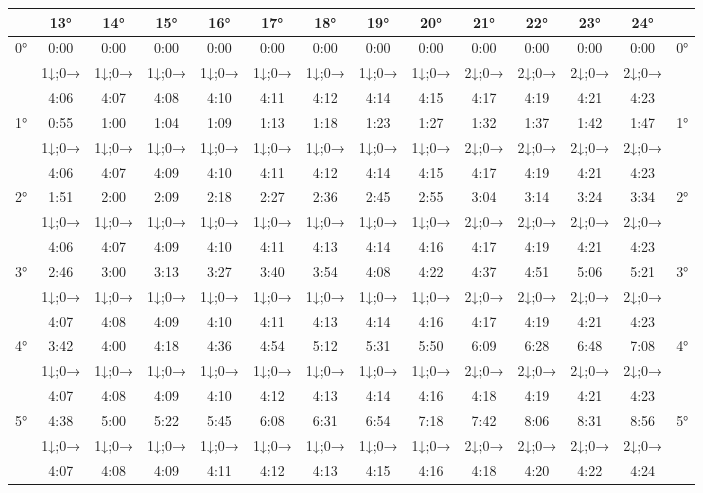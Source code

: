 \begin{scriptsize}\begin{tabular}{c || c | c | c | c | c | c | c | c | c | c | c | c || c}
		\space &13°&14°&15°&16°&17°&18°&19°&20°&21°&22°&23°&24°\\\hline\hline
		\multirow{3}{*}{0°}&0:00&0:00&0:00&0:00&0:00&0:00&0:00&0:00&0:00&0:00&0:00&0:00&\multirow{3}{*}{0°}\\ \space&1↓;0→&1↓;0→&1↓;0→&1↓;0→&1↓;0→&1↓;0→&1↓;0→&1↓;0→&2↓;0→&2↓;0→&2↓;0→&2↓;0→&\space\\&4:06&4:07&4:08&4:10&4:11&4:12&4:14&4:15&4:17&4:19&4:21&4:23&\space\\\hline
		\multirow{3}{*}{1°}&0:55&1:00&1:04&1:09&1:13&1:18&1:23&1:27&1:32&1:37&1:42&1:47&\multirow{3}{*}{1°}\\ \space&1↓;0→&1↓;0→&1↓;0→&1↓;0→&1↓;0→&1↓;0→&1↓;0→&1↓;0→&2↓;0→&2↓;0→&2↓;0→&2↓;0→&\space\\&4:06&4:07&4:09&4:10&4:11&4:12&4:14&4:15&4:17&4:19&4:21&4:23&\space\\\hline
		\multirow{3}{*}{2°}&1:51&2:00&2:09&2:18&2:27&2:36&2:45&2:55&3:04&3:14&3:24&3:34&\multirow{3}{*}{2°}\\ \space&1↓;0→&1↓;0→&1↓;0→&1↓;0→&1↓;0→&1↓;0→&1↓;0→&1↓;0→&2↓;0→&2↓;0→&2↓;0→&2↓;0→&\space\\&4:06&4:07&4:09&4:10&4:11&4:13&4:14&4:16&4:17&4:19&4:21&4:23&\space\\\hline
		\multirow{3}{*}{3°}&2:46&3:00&3:13&3:27&3:40&3:54&4:08&4:22&4:37&4:51&5:06&5:21&\multirow{3}{*}{3°}\\ \space&1↓;0→&1↓;0→&1↓;0→&1↓;0→&1↓;0→&1↓;0→&1↓;0→&1↓;0→&2↓;0→&2↓;0→&2↓;0→&2↓;0→&\space\\&4:07&4:08&4:09&4:10&4:11&4:13&4:14&4:16&4:17&4:19&4:21&4:23&\space\\\hline
		\multirow{3}{*}{4°}&3:42&4:00&4:18&4:36&4:54&5:12&5:31&5:50&6:09&6:28&6:48&7:08&\multirow{3}{*}{4°}\\ \space&1↓;0→&1↓;0→&1↓;0→&1↓;0→&1↓;0→&1↓;0→&1↓;0→&1↓;0→&2↓;0→&2↓;0→&2↓;0→&2↓;0→&\space\\&4:07&4:08&4:09&4:10&4:12&4:13&4:14&4:16&4:18&4:19&4:21&4:23&\space\\\hline
		\multirow{3}{*}{5°}&4:38&5:00&5:22&5:45&6:08&6:31&6:54&7:18&7:42&8:06&8:31&8:56&\multirow{3}{*}{5°}\\ \space&1↓;0→&1↓;0→&1↓;0→&1↓;0→&1↓;0→&1↓;0→&1↓;0→&1↓;0→&2↓;0→&2↓;0→&2↓;0→&2↓;0→&\space\\&4:07&4:08&4:09&4:11&4:12&4:13&4:15&4:16&4:18&4:20&4:22&4:24&\space\\\hline

\end{tabular}
\end{scriptsize}
